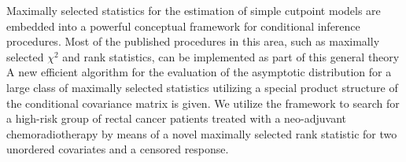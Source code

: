 Maximally selected statistics for the estimation of simple cutpoint models
are embedded into a powerful conceptual framework for conditional inference
procedures. 
Most of the published procedures in this area, such as maximally selected
$\chi^2$ and rank statistics, can be implemented as part of this general theory
A new efficient algorithm for the evaluation of the asymptotic distribution 
for a large class of maximally selected statistics utilizing a special 
product structure of the conditional covariance matrix is given.
We utilize the framework to search for a high-risk group of rectal
cancer patients treated with a neo-adjuvant chemoradiotherapy by means of a novel
maximally selected rank statistic for two unordered covariates and 
a censored response.
